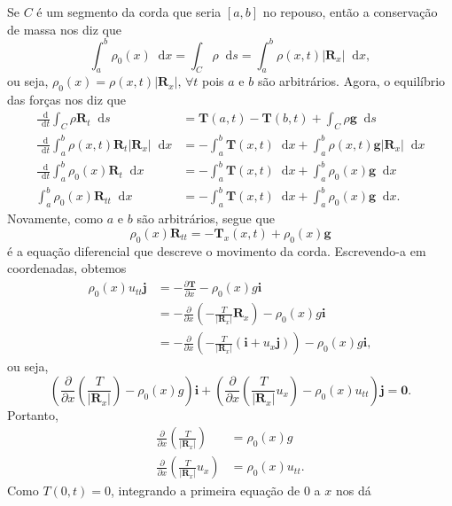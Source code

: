 \documentclass[twocolumn,showpacs,%
  nofootinbib,aps,superscriptaddress,%
  eqsecnum,prd,notitlepage,showkeys,10pt]{revtex4-1}
\newcommand*\diff{\mathop{}\!\mathrm{d}}
\begin{document}
Se $C$ é um segmento da corda que seria $[a,b]$ no repouso, então a conservação
de massa nos diz que
%
\[
    \int_a^b \rho_0(x) \diff x = \int_C \rho \diff s = \int_a^b \rho(x,t)|\mathbf{R}_x| \diff x,
\]
%
ou seja, $\rho_0(x) = \rho(x,t)|\mathbf{R}_x|, \, \forall t$ pois $a$ e $b$ são arbitrários.
Agora, o equilíbrio das forças nos diz que
%
\begin{align*}
    \frac{\diff}{\diff t} \int_C \rho \mathbf{R}_t \diff s 
    &= \mathbf{T}(a,t) - \mathbf{T}(b,t) + \int_C \rho\mathbf{g} \diff s \\
    \frac{\diff}{\diff t} \int_a^b \rho(x,t)\mathbf{R}_t |\mathbf{R}_x| \diff x 
    &= -\int_a^b \mathbf{T}(x,t) \diff x + \int_a^b \rho(x,t)\mathbf{g}|\mathbf{R}_x| \diff x \\
    \frac{\diff}{\diff t}\int_a^b \rho_0(x) \mathbf{R}_t \diff x
    &= -\int_a^b \mathbf{T}(x,t) \diff x + \int_a^b \rho_0(x)\mathbf{g} \diff x \\
    \int_a^b \rho_0(x) \mathbf{R}_{tt} \diff x
    &= -\int_a^b \mathbf{T}(x,t) \diff x + \int_a^b \rho_0(x)\mathbf{g} \diff x.
\end{align*}
%
Novamente, como $a$ e $b$ são arbitrários, segue que
%
\[
    \rho_0(x)\mathbf{R}_{tt} = -\mathbf{T}_x(x,t) + \rho_0(x)\mathbf{g}
\]
%
é a equação diferencial que descreve o movimento da corda. Escrevendo-a em coordenadas,
obtemos
%
\begin{align*}
    \rho_0(x) u_{tt}\mathbf{j}
    &= -\frac{\partial\mathbf{T}}{\partial x} - \rho_0(x)g\mathbf{i} \\
    &= -\frac{\partial}{\partial x}\left( -\frac{T}{|\mathbf{R}_x|}\mathbf{R}_x \right)
    - \rho_0(x)g\mathbf{i} \\
    &= -\frac{\partial}{\partial x}\left( -\frac{T}{|\mathbf{R}_x|}(\mathbf{i} + u_x\mathbf{j})
    \right)
    - \rho_0(x)g\mathbf{i},
\end{align*}
%
ou seja,
%
\[
    \left( \frac{\partial}{\partial x}\left( \frac{T}{|\mathbf{R}_x|} \right)
    - \rho_0(x)g \right)\mathbf{i} + 
    \left( \frac{\partial}{\partial x}\left( \frac{T}{|\mathbf{R}_x|}u_x \right)
    - \rho_0(x)u_{tt} \right)\mathbf{j}
    = \mathbf{0}.
\]
%
Portanto,
%
\begin{align*}
    \frac{\partial}{\partial x}\left( \frac{T}{|\mathbf{R}_x|} \right)
    &= \rho_0(x)g \\
    \frac{\partial}{\partial x}\left( \frac{T}{|\mathbf{R}_x|}u_x \right)
    &= \rho_0(x)u_{tt}.
\end{align*}
%
Como $T(0,t) = 0$, integrando a primeira equação de $0$ a $x$ nos dá
\end{document}

